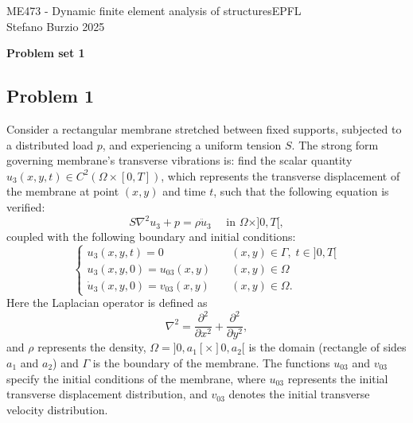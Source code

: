 \documentclass[12pt]{article}
\begin{document}
\noindent ME473 - Dynamic finite element analysis of structures\hfill EPFL\\
Stefano Burzio \hfill 2025\\
\vspace{0.3cm}

\hspace*{\fill}\textbf{\Large Problem set 1}\hspace*{\fill}

\hrulefill

\subsection*{Problem 1}
Consider a rectangular membrane stretched between fixed supports, subjected to a distributed load $p$, and experiencing a uniform tension $S$. The strong form governing membrane's transverse vibrations is: find the scalar quantity $u_3\left(x, y, t\right) \in C^2(\Omega \times[0, T])$, which represents the transverse displacement of the membrane at point $\left(x, y\right)$ and time $t$, such that the following equation is verified:
$$S \nabla^2 u_3+p=\rho \ddot{u}_3 \quad \text { in } \Omega \times] 0, T[,$$
            coupled with the following boundary and initial conditions:
        $$
        \begin{cases}
            u_3(x, y, t) = 0                  & \quad (x, y) \in \Gamma, \; t \in ]0, T[ \\
            u_3(x, y, 0) = u_{03}(x, y)       & \quad (x, y) \in \Omega                  \\
            \dot{u}_3(x, y, 0) = v_{03}(x, y) & \quad (x, y) \in \Omega.
        \end{cases}
        $$
        Here the Laplacian operator is defined as
        \[
            \nabla^2 = \frac{\partial^2}{\partial x^2} + \frac{\partial^2}{\partial y^2},
        \]
        and $\rho$ represents the density, $\Omega = ]0, a_1[ \times ]0, a_2[$ is the domain (rectangle of sides $a_1$ and $a_2$) and $\Gamma$ is the boundary of the membrane. The functions $u_{03}$ and $v_{03}$ specify the initial conditions of the membrane, where $u_{03}$ represents the initial transverse displacement distribution, and $v_{03}$ denotes the initial transverse velocity distribution.
\end{document}
